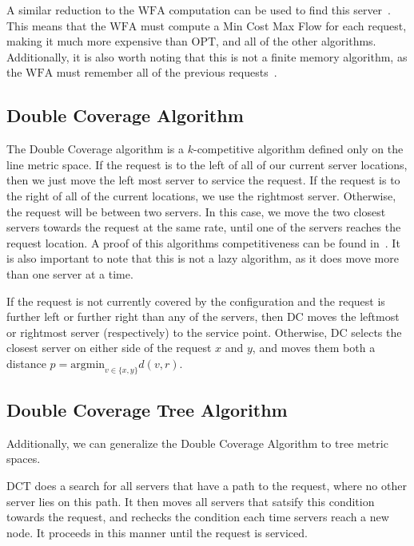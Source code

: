 A similar reduction to the $\mathrm{WFA}$ computation can be used to find this server~\cite{WFA2009}. This means that the $\mathrm{WFA}$ must compute a Min Cost Max Flow for each request, making it much more expensive than $\mathrm{OPT}$, and all of the other algorithms. Additionally, it is also worth noting that this is not a finite memory algorithm, as the $\mathrm{WFA}$ must remember all of the previous requests~\cite{MAXMAX2005}. 

\subsection{Double Coverage Algorithm}
\label{sec:DC}
The Double Coverage algorithm is a $k$-competitive algorithm defined only on the line metric space. If the request is to the left of all of our current server locations, then we just move the left most server to service the request. If the request is to the right of all of the current locations, we use the rightmost server. Otherwise, the request will be between two servers. In this case, we move the two closest servers towards the request at the same rate, until one of the servers reaches the request location. A proof of this algorithms competitiveness can be found in~\cite{OnlineComp1998}. It is also important to note that this is not a lazy algorithm, as it does move more than one server at a time. 

\begin{definition}
    If the request is not currently covered by the configuration and the request is further left or further right than any of the servers, then $\mathrm{DC}$ moves the leftmost or rightmost server (respectively) to the service point. Otherwise, $\mathrm{DC}$ selects the closest server on either side of the request $x$ and $y$, and moves them both a distance $p = \mathrm{argmin}_{v \in \{x, y\}} d(v, r)$.
\end{definition}

\subsection{Double Coverage Tree Algorithm}
Additionally, we can generalize the Double Coverage Algorithm to tree metric spaces. 

\begin{definition}
    $\mathrm{DCT}$ does a search for all servers that have a path to the request, where no other server lies on this path. It then moves all servers that satsify this condition towards the request, and rechecks the condition each time servers reach a new node. It proceeds in this manner until the request is serviced.
\end{definition}

